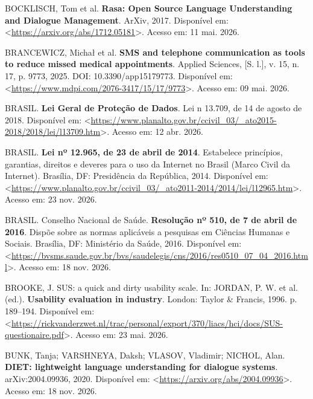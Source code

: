 \documentclass[12pt,a4paper]{extarticle}
\begin{document}
\vspace{0.5cm}\noindent
BOCKLISCH, Tom et al. \textbf{Rasa: Open Source Language Understanding and Dialogue Management}. ArXiv, 2017. Disponível em: <\url{https://arxiv.org/abs/1712.05181}>. Acesso em: 11 mai. 2026.

\vspace{0.5cm}\noindent
BRANCEWICZ, Michał et al. \textbf{SMS and telephone communication as tools to reduce missed medical appointments}. Applied Sciences, [S. l.], v. 15, n. 17, p. 9773, 2025. DOI: 10.3390/app15179773. Disponível em: <\url{https://www.mdpi.com/2076-3417/15/17/9773}>. Acesso em: 09 mai. 2026.

\vspace{0.5cm}\noindent
BRASIL. \textbf{Lei Geral de Proteção de Dados}. Lei n\textordmasculine{} 13.709, de 14 de agosto de 2018. Disponível em: <\url{https://www.planalto.gov.br/ccivil_03/_ato2015-2018/2018/lei/l13709.htm}>. Acesso em: 12 abr. 2026.

\vspace{0.5cm}\noindent
BRASIL. \textbf{Lei nº 12.965, de 23 de abril de 2014}. Estabelece princípios, garantias, direitos e deveres para o uso da Internet no Brasil (Marco Civil da Internet). Brasília, DF: Presidência da República, 2014. Disponível em: <\url{https://www.planalto.gov.br/ccivil_03/_ato2011-2014/2014/lei/l12965.htm}>. Acesso em: 23 nov. 2026.

\vspace{0.5cm}\noindent
BRASIL. Conselho Nacional de Saúde. \textbf{Resolução nº 510, de 7 de abril de 2016}. Dispõe sobre as normas aplicáveis a pesquisas em Ciências Humanas e Sociais. Brasília, DF: Ministério da Saúde, 2016. Disponível em: <\url{https://bvsms.saude.gov.br/bvs/saudelegis/cns/2016/res0510_07_04_2016.html}>. Acesso em: 18 nov. 2026.

\vspace{0.5cm}\noindent
BROOKE, J. SUS: a quick and dirty usability scale. In: JORDAN, P. W. et al. (ed.). \textbf{Usability evaluation in industry}. London: Taylor \& Francis, 1996. p. 189--194. Disponível em: <\url{https://rickvanderzwet.nl/trac/personal/export/370/liacs/hci/docs/SUS-questionaire.pdf}>. Acesso em: 23 mai. 2026.

\vspace{0.5cm}\noindent
BUNK, Tanja; VARSHNEYA, Daksh; VLASOV, Vladimir; NICHOL, Alan. \textbf{DIET: lightweight language understanding for dialogue systems}. arXiv:2004.09936, 2020. Disponível em: <\url{https://arxiv.org/abs/2004.09936}>. Acesso em: 18 nov. 2026.
\end{document}
